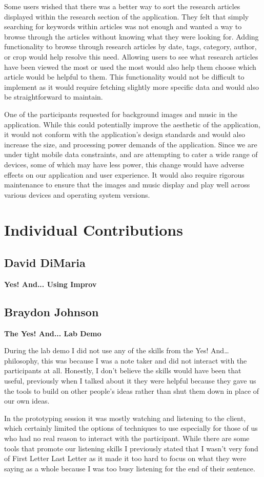 \documentclass[12pt,letterpaper]{article}
\begin{document}
Some users wished that there was a better way to sort the research articles displayed within the research section of the application. They felt that simply searching for keywords within articles was not enough and wanted a way to browse through the articles without knowing what they were looking for. Adding functionality to browse through research articles by date, tags, category, author, or crop would help resolve this need. Allowing users to see what research articles have been viewed the most or used the most would also help them choose which article would be helpful to them. This functionality would not be difficult to implement as it would require fetching slightly more specific data and would also be straightforward to maintain.\par
One of the participants requested for background images and music in the application. While this could potentially improve the aesthetic of the application, it would not conform with the application's design standards and would also increase the size, and processing power demands of the application. Since we are under tight mobile data constraints, and are attempting to cater a wide range of devices, some of which may have less power, this change would have adverse effects on our application and user experience. It would also require rigorous maintenance to ensure that the images and music display and play well across various devices and operating system versions. 

\clearpage
\section{Individual Contributions}
\subsection{David DiMaria}
\textbf{Yes! And... Using Improv}\par


\clearpage
\subsection{Braydon Johnson}
\textbf{The Yes! And... Lab Demo}\par
During the lab demo I did not use any of the skills from the Yes! And… philosophy, this was because I was a note taker and did not interact with the participants at all. Honestly, I don’t believe the skills would have been that useful, previously when I talked about it they were helpful because they gave us the tools to build on other people’s ideas rather than shut them down in place of our own ideas.\par
In the prototyping session it was mostly watching and listening to the client, which certainly limited the options of techniques to use especially for those of us who had no real reason to interact with the participant. While there are some tools that promote our listening skills I previously stated that I wasn’t very fond of First Letter Last Letter as it made it too hard to focus on what they were saying as a whole because I was too busy listening for the end of their sentence. 
\end{document}
